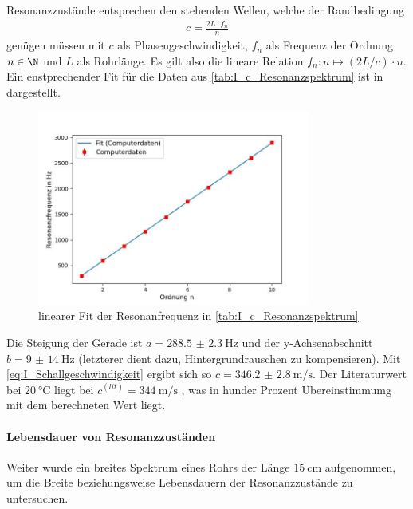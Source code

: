 \documentclass[../main.tex]{subfiles}
\begin{document}
        Resonanzzustände entsprechen den stehenden Wellen, welche der Randbedingung
        \begin{align}
            c = \frac{2 L\cdot f_n}{n}
            \label{eq:I_Schallgeschwindigkeit}
        \end{align}
        genügen müssen mit $c$ als Phasengeschwindigkeit, $f_n$ als Frequenz der Ordnung $n\in\N$ und $L$ als Rohrlänge. Es gilt also die lineare Relation $f_n: n\mapsto (2L/ c)\cdot n$. Ein enstprechender Fit für die Daten aus \ref{tab:I_c_Resonanzspektrum} ist in dargestellt.

        \begin{figure}[H]
            \centering
            \includegraphics[width=0.8\textwidth]{Bilddateien/Auswertung/I_Schallgeschwindigkeitfit.jpg}
            \caption{linearer Fit der Resonanfrequenz in \ref{tab:I_c_Resonanzspektrum}}
            \label{fig:I_Schallgeschwindigkeitfit}
        \end{figure}

        Die Steigung der Gerade ist $a=\SI{288.5(23)}{\hertz}$ und der y-Achsenabschnitt $b=\SI{9(14)}{\hertz}$ (letzterer dient dazu, Hintergrundrauschen zu kompensieren). Mit \eqref{eq:I_Schallgeschwindigkeit} ergibt sich so $c=\SI{346.2(28)}{\metre\per\second}$. Der Literaturwert bei $\SI{20}{\celsius}$ liegt bei $c^{(lit)}=\SI{344}{\metre\per\second}$ \cite{const:sound}, was in hunder Prozent Übereinstimmumg mit dem berechneten Wert liegt.

    \paragraph{Lebensdauer von Resonanzzuständen}
        Weiter wurde ein breites Spektrum eines Rohrs der Länge $\SI{15}{\centi\metre}$ aufgenommen, um die Breite beziehungsweise Lebensdauern der Resonanzzustände zu untersuchen.
\end{document}
